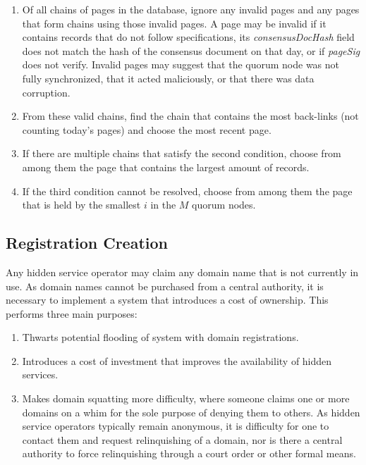 \begin{enumerate}
	\item Of all chains of pages in the database, ignore any invalid pages and any pages that form chains using those invalid pages. A page may be invalid if it contains records that do not follow specifications, its \emph{consensusDocHash} field does not match the hash of the consensus document on that day, or if \emph{pageSig} does not verify. Invalid pages may suggest that the quorum node was not fully synchronized, that it acted maliciously, or that there was data corruption.
	\item From these valid chains, find the chain that contains the most back-links (not counting today's pages) and choose the most recent page.
	\item If there are multiple chains that satisfy the second condition, choose from among them the page that contains the largest amount of records.
	\item If the third condition cannot be resolved, choose from among them the page that is held by the smallest $ i $ in the $ M $ quorum nodes.
\end{enumerate}


\subsection{Registration Creation}

Any hidden service operator may claim any domain name that is not currently in use. As domain names cannot be purchased from a central authority, it is necessary to implement a system that introduces a cost of ownership. This performs three main purposes: 

\begin{enumerate}
	\item Thwarts potential flooding of system with domain registrations.
	\item Introduces a cost of investment that improves the availability of hidden services.
	\item Makes domain squatting more difficulty, where someone claims one or more domains on a whim for the sole purpose of denying them to others. As hidden service operators typically remain anonymous, it is difficulty for one to contact them and request relinquishing of a domain, nor is there a central authority to force relinquishing through a court order or other formal means.
\end{enumerate}

